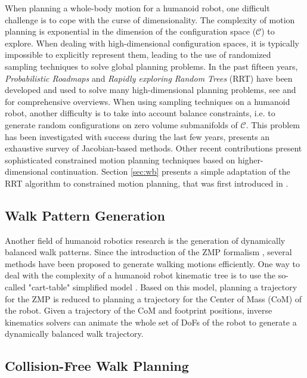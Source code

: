 \documentclass{article}
\begin{document}
When  planning a  whole-body motion  for a  humanoid robot, one difficult
challenge is to cope with  the curse of dimensionality. The complexity
of   motion  planning  is   exponential  in   the  dimension   of  the
configuration  space ($\mathcal{C}$)  to explore.  When  dealing with
high-dimensional configuration  spaces, it is  typically impossible to
explicitly represent  them, leading to the use  of randomized sampling
techniques  to solve  global planning  problems. In  the  past fifteen
years,  \textit{Probabilistic Roadmaps} \cite{kavraki1996prp} and  
\textit{Rapidly exploring Random  Trees} (RRT) 
\cite{kuffner00rrtconnect}  have been  developed and  used to  solve many
high-dimensional   planning  problems, see \cite{Lav06} and \cite{choset2005prm} for comprehensive
overviews.
When  using  sampling  techniques  on  a humanoid  robot,  another difficulty
is to  take into  account balance  constraints,  i.e. to
generate  random  configurations   on  zero  volume  submanifolds  of
$\mathcal{C}$. This problem has been investigated with success during
the last few years, \cite{Berenson15032011} presents an exhaustive survey
of Jacobian-based methods. Other recent contributions \cite{porta2012randomized}
present sophisticated constrained motion planning techniques based on higher-dimensional
continuation. Section \ref{sec:wb} presents a simple adaptation
of the RRT algorithm to constrained motion planning, that was first
introduced in \cite{dalibard09}.

\subsection{Walk Pattern Generation}

Another  field of  humanoid  robotics research  is  the generation  of
dynamically balanced walk patterns. Since  the introduction of  the ZMP
formalism  \cite{vukobratovic1969contribution},  several  methods  have  been  proposed  to
generate  walking  motions efficiently.   One  way  to  deal with  the
complexity  of a  humanoid  robot  kinematic tree  is  to use  the
so-called "cart-table" simplified model \cite{kajita2003biped}. Based on this
model,  planning a trajectory  for the  ZMP is  reduced to  planning a
trajectory  for  the Center  of  Mass (CoM)  of  the  robot.  Given  a
trajectory  of  the CoM  and  footprint  positions, inverse  kinematics
solvers can animate  the whole set of DoFs of the
robot to generate a dynamically balanced walk trajectory.


\subsection{Collision-Free Walk Planning}
\end{document}
